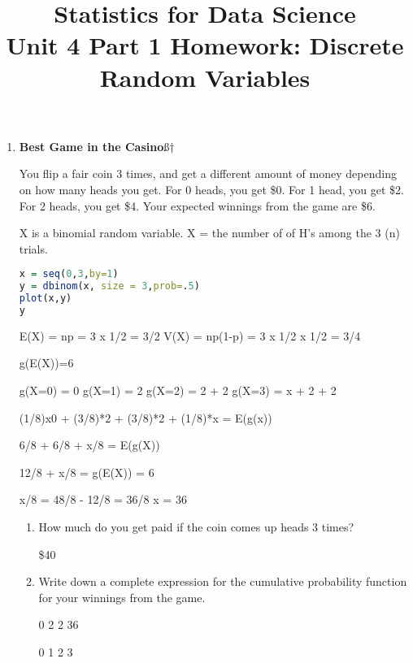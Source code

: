 \documentclass[12pt,a4paper]{article}
\numberwithin{equation}{subsection}
\begin{document}
\title{Statistics for Data Science \\
       Unit 4 Part 1 Homework: Discrete Random Variables}
\maketitle

\begin{enumerate}

\item \textbf{Best Game in the Casino}ß†

You flip a fair coin 3 times, and get a different amount of money depending on how many heads you get. For 0 heads, you get \$0. For 1 head, you get \$2. For 2 heads, you get \$4. Your expected winnings from the game are \$6. 

X is a binomial random variable. X = the number of of H's among the 3 (n) trials.


\begin{lstlisting}[language=R]
x = seq(0,3,by=1)
y = dbinom(x, size = 3,prob=.5)
plot(x,y)
y
\end{lstlisting}


E(X) = np = 3 x 1/2 = 3/2
V(X) = np(1-p) = 3 x 1/2 x 1/2 = 3/4

g(E(X))=6

g(X=0) = 0
g(X=1) = 2
g(X=2) = 2 + 2
g(X=3) = x + 2 + 2


(1/8)x0 + (3/8)*2 + (3/8)*2 + (1/8)*x = E(g(x))

6/8 + 6/8 + x/8 = E(g(X))

12/8 + x/8 = g(E(X)) = 6

x/8 = 48/8 - 12/8 = 36/8
x = 36


\begin{enumerate}
\item How much do you get paid if the coin comes up heads 3 times?

\$40

\item Write down a complete expression for the cumulative probability function for your winnings from the game.

0  2   2  36

0  1   2   3



\end{enumerate}


\end{enumerate}
\end{document}
